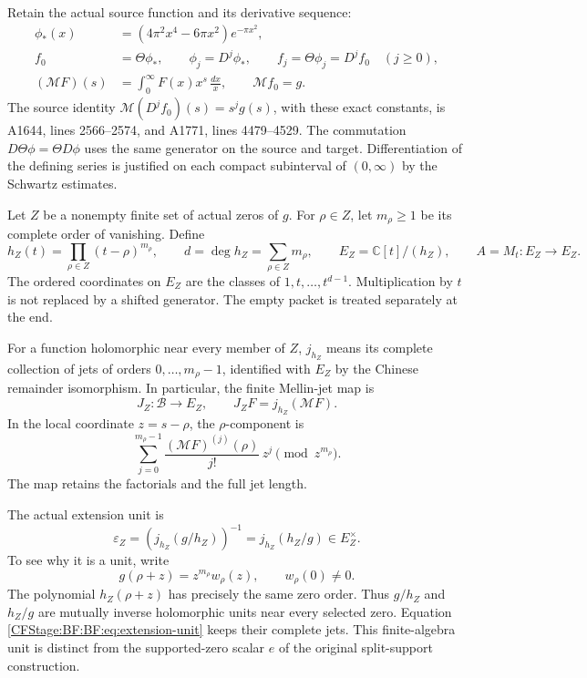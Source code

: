 Retain the actual source function and its derivative sequence:
\begin{equation}
\begin{split}
\phi_*(x)&=(4\pi^2x^4-6\pi x^2)e^{-\pi x^2},\\
f_0&=\Theta\phi_*,
\qquad \phi_j=D^j\phi_*,
\qquad f_j=\Theta\phi_j=D^jf_0\quad(j\ge0),\\
(\mathcal MF)(s)&=\int_0^\infty F(x)x^s\,\frac{dx}{x},
\qquad \mathcal Mf_0=g.
\end{split}
\tag{BF.02}\label{CFStage:BF:BF:eq:theta-source}
\end{equation}
The source identity \(\mathcal M(D^jf_0)(s)=s^jg(s)\), with these exact
constants, is A1644, lines 2566--2574, and A1771, lines 4479--4529.
The commutation \(D\Theta\phi=\Theta D\phi\) uses the same generator on
the source and target.  Differentiation of the defining series is
justified on each compact subinterval of \((0,\infty)\) by the
Schwartz estimates.

Let \(Z\) be a nonempty finite set of actual zeros of \(g\).  For
\(\rho\in Z\), let \(m_\rho\ge1\) be its complete order of vanishing.
Define
\begin{equation}
h_Z(t)=\prod_{\rho\in Z}(t-\rho)^{m_\rho},\qquad
d=\deg h_Z=\sum_{\rho\in Z}m_\rho,\qquad
E_Z=\mathbb C[t]/(h_Z),\qquad
A=M_t:E_Z\longrightarrow E_Z.
\tag{BF.03}\label{CFStage:BF:BF:eq:packet}
\end{equation}
The ordered coordinates on \(E_Z\) are the classes of
\(1,t,\ldots,t^{d-1}\).  Multiplication by \(t\) is not replaced by a
shifted generator.  The empty packet is treated separately at the end.

For a function holomorphic near every member of \(Z\), \(j_{h_Z}\)
means its complete collection of jets of orders \(0,\ldots,m_\rho-1\),
identified with \(E_Z\) by the Chinese remainder isomorphism.
In particular, the finite Mellin-jet map is
\[
J_Z:\mathcal B\longrightarrow E_Z,\qquad
J_ZF=j_{h_Z}(\mathcal MF).
\]
In the local coordinate \(z=s-\rho\), the \(\rho\)-component is
\[
\sum_{j=0}^{m_\rho-1}
\frac{(\mathcal MF)^{(j)}(\rho)}{j!}\,z^j
       \pmod{z^{m_\rho}}.
\]
The map retains the factorials and the full jet length.

The actual extension unit is
\begin{equation}
\varepsilon_Z
 =\left(j_{h_Z}(g/h_Z)\right)^{-1}
 =j_{h_Z}(h_Z/g)\in E_Z^\times.
\tag{BF.04}\label{CFStage:BF:BF:eq:extension-unit}
\end{equation}
To see why it is a unit, write
\[
g(\rho+z)=z^{m_\rho}w_\rho(z),\qquad w_\rho(0)\ne0.
\]
The polynomial \(h_Z(\rho+z)\) has precisely the same zero order.
Thus \(g/h_Z\) and \(h_Z/g\) are mutually inverse holomorphic units
near every selected zero.  Equation \eqref{CFStage:BF:BF:eq:extension-unit}
keeps their complete jets.  This finite-algebra unit is distinct from
the supported-zero scalar \(e\) of the original split-support
construction.

